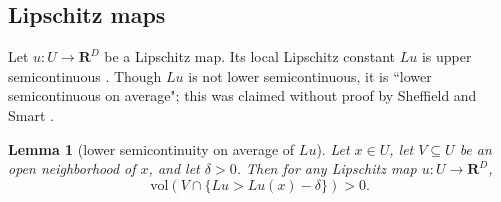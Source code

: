 \documentclass[reqno,11pt]{amsart}
\newcommand{\RR}{\mathbf{R}}
\newcommand{\vol}{\mathrm{vol}}
\newtheorem{lemma}[theorem]{Lemma}
\theoremstyle{definition}
\numberwithin{equation}{section}
\begin{document}
\subsection{Lipschitz maps}
Let $u: U \to \RR^D$ be a Lipschitz map.
Its local Lipschitz constant $Lu$ is upper semicontinuous \cite[Lemma 4.2(a)]{Crandall2008}.
Though $Lu$ is not lower semicontinuous, it is ``lower semicontinuous on average"; this was claimed without proof by Sheffield and Smart \cite[\S1.4]{Sheffield12}.

\begin{lemma}[lower semicontinuity on average of $Lu$]\label{partial lower semicontinuity}
Let $x \in U$, let $V \subseteq U$ be an open neighborhood of $x$, and let $\delta > 0$.
Then for any Lipschitz map $u: U \to \RR^D$,
$$\vol(V \cap \{Lu > Lu(x) - \delta\}) > 0.$$
\end{lemma}
\end{document}
